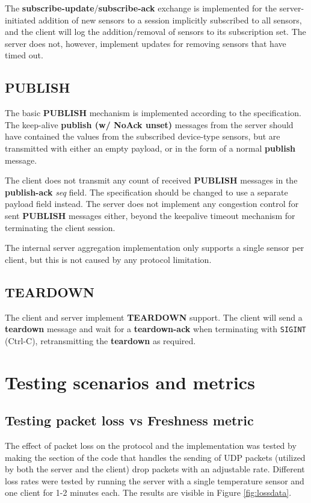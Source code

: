 \documentclass[a4paper]{article}
\begin{document}
The \textbf{subscribe-update}/\textbf{subscribe-ack} exchange is implemented for the server-initiated addition of new sensors to a session implicitly subscribed to all sensors, and the client will log the addition/removal of sensors to its subscription set.
The server does not, however, implement updates for removing sensors that have timed out.

\subsection{\textbf{PUBLISH}}
The basic \textbf{PUBLISH} mechanism is implemented according to the specification.
The keep-alive \textbf{publish (w/ NoAck unset)} messages from the server should have contained the values from the subscribed device-type sensors, but are transmitted with either an empty payload, or in the form of a normal \textbf{publish} message.

The client does not transmit any count of received \textbf{PUBLISH} messages in the \textbf{publish-ack} \textit{seq} field.
The specification should be changed to use a separate payload field instead.
The server does not implement any congestion control for sent \textbf{PUBLISH} messages either, beyond the keepalive timeout mechanism for terminating the client session.

The internal server aggregation implementation only supports a single sensor per client, but this is not caused by any protocol limitation.

\subsection{\textbf{TEARDOWN}}
The client and server implement \textbf{TEARDOWN} support.
The client will send a \textbf{teardown} message and wait for a \textbf{teardown-ack} when terminating with \texttt{SIGINT} (Ctrl-C), retransmitting the \textbf{teardown} as required.

\section{Testing scenarios and metrics}


\subsection{Testing packet loss vs Freshness metric}
The effect of packet loss on the protocol and the implementation was tested by 
making the section of the code that handles the sending of UDP packets (utilized
by both the server and the client) drop packets with an adjustable rate.
Different loss rates were tested by running the server with a single temperature
sensor and one client for 1-2 minutes each. The results are visible in Figure 
\ref{fig:lossdata}.
\end{document}
